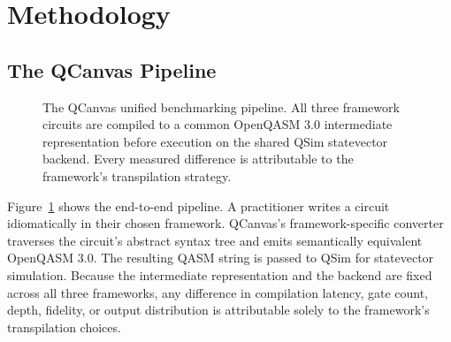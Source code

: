 \section{Methodology}

\subsection{The QCanvas Pipeline}

\begin{figure}[t]
\centering
{}
\caption{The QCanvas unified benchmarking pipeline.
  All three framework circuits are compiled to a common OpenQASM 3.0
  intermediate representation before execution on the shared QSim
  statevector backend.
  Every measured difference is attributable to the framework's
  transpilation strategy.}
\label{fig:pipeline}
\end{figure}

Figure~\ref{fig:pipeline} shows the end-to-end pipeline.
A practitioner writes a circuit idiomatically in their chosen framework.
QCanvas's framework-specific converter traverses the circuit's abstract
syntax tree and emits semantically equivalent OpenQASM 3.0.
The resulting QASM string is passed to QSim for statevector simulation.
Because the intermediate representation and the backend are fixed across
all three frameworks, any difference in compilation latency, gate count,
depth, fidelity, or output distribution is attributable solely to the
framework's transpilation choices.

